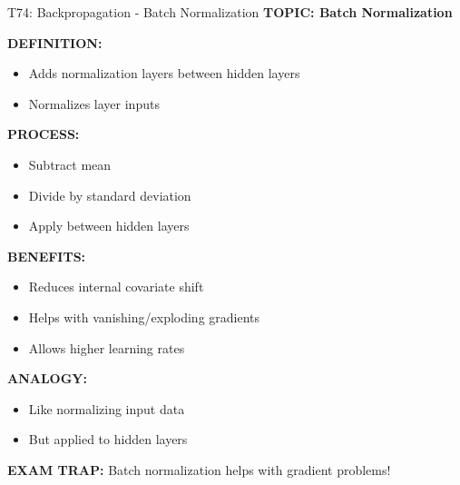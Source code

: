 \documentclass[8pt]{beamer}
\begin{document}
	\begin{frame}{T74: Backpropagation - Batch Normalization}
		\fontsize{6.5}{7.5}\selectfont
		\textbf{TOPIC: Batch Normalization}
		
		\vspace{0.1cm}
		\textbf{DEFINITION:}
		\begin{itemize}
			\item Adds normalization layers between hidden layers
			\item Normalizes layer inputs
		\end{itemize}
		
		\vspace{0.1cm}
		\textbf{PROCESS:}
		\begin{itemize}
			\item Subtract mean
			\item Divide by standard deviation
			\item Apply between hidden layers
		\end{itemize}
		
		\vspace{0.1cm}
		\textbf{BENEFITS:}
		\begin{itemize}
			\item Reduces internal covariate shift
			\item Helps with vanishing/exploding gradients
			\item Allows higher learning rates
		\end{itemize}
		
		\vspace{0.1cm}
		\textbf{ANALOGY:}
		\begin{itemize}
			\item Like normalizing input data
			\item But applied to hidden layers
		\end{itemize}
		
		\textcolor{myred}{\textbf{EXAM TRAP:}} Batch normalization helps with \textcolor{myblue}{gradient problems}!
	\end{frame}
	
\end{document}
